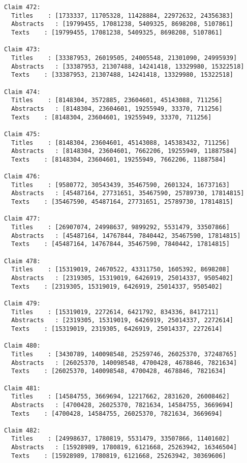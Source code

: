 \documentclass[11pt]{article}
\begin{document}
\begin{Verbatim}[commandchars=\\\{\}]
Claim 472:
  Titles    : [1733337, 11705328, 11428884, 22972632, 24356383]
  Abstracts   : [19799455, 17081238, 5409325, 8698208, 5107861]
  Texts    : [19799455, 17081238, 5409325, 8698208, 5107861]

Claim 473:
  Titles    : [33387953, 26019505, 24005548, 21301090, 24995939]
  Abstracts   : [33387953, 21307488, 14241418, 13329980, 15322518]
  Texts    : [33387953, 21307488, 14241418, 13329980, 15322518]

Claim 474:
  Titles    : [8148304, 3572885, 23604601, 45143088, 711256]
  Abstracts   : [8148304, 23604601, 19255949, 33370, 711256]
  Texts    : [8148304, 23604601, 19255949, 33370, 711256]

Claim 475:
  Titles    : [8148304, 23604601, 45143088, 145383432, 711256]
  Abstracts   : [8148304, 23604601, 7662206, 19255949, 11887584]
  Texts    : [8148304, 23604601, 19255949, 7662206, 11887584]

Claim 476:
  Titles    : [9580772, 30543439, 35467590, 2601324, 16737163]
  Abstracts   : [45487164, 27731651, 35467590, 25789730, 17814815]
  Texts    : [35467590, 45487164, 27731651, 25789730, 17814815]

Claim 477:
  Titles    : [26907074, 24998637, 9899292, 5531479, 33507866]
  Abstracts   : [45487164, 14767844, 7840442, 35467590, 17814815]
  Texts    : [45487164, 14767844, 35467590, 7840442, 17814815]

Claim 478:
  Titles    : [15319019, 24670522, 43311750, 1605392, 8698208]
  Abstracts   : [2319305, 15319019, 6426919, 25014337, 9505402]
  Texts    : [2319305, 15319019, 6426919, 25014337, 9505402]

Claim 479:
  Titles    : [15319019, 2272614, 6421792, 834336, 8417211]
  Abstracts   : [2319305, 15319019, 6426919, 25014337, 2272614]
  Texts    : [15319019, 2319305, 6426919, 25014337, 2272614]

Claim 480:
  Titles    : [3430789, 140098548, 25259746, 26025370, 37248765]
  Abstracts   : [26025370, 140098548, 4700428, 4678846, 7821634]
  Texts    : [26025370, 140098548, 4700428, 4678846, 7821634]

Claim 481:
  Titles    : [14584755, 3669694, 12217662, 2831620, 26008462]
  Abstracts   : [4700428, 26025370, 7821634, 14584755, 3669694]
  Texts    : [4700428, 14584755, 26025370, 7821634, 3669694]

Claim 482:
  Titles    : [24998637, 1780819, 5531479, 33507866, 11401602]
  Abstracts   : [15928989, 1780819, 6121668, 25263942, 16346504]
  Texts    : [15928989, 1780819, 6121668, 25263942, 30369606]


\end{Verbatim}
\end{document}
